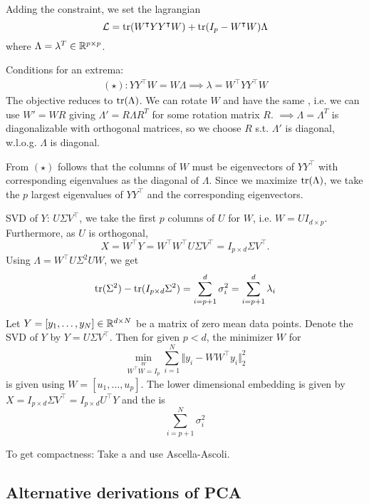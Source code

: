 Adding the constraint, we set the lagrangian 
\[\mathcal{L}=\text{tr}(W^\intercal YY^\intercal W)+\text{tr}(I_p-W^\intercal W)\Lambda\]
where $\Lambda=\lambda^T\in\mathbb{R}^{p\times p}$.

Conditions for an extrema:
\begin{align*}
    (\star):YY^\intercal W = W\Lambda\implies \lambda=W^\intercal YY^\intercal W
\end{align*}
The objective reduces to $\text{tr}(\Lambda)$. We can rotate $W$ and have the same ,
i.e. we can use $W'=WR$ giving $\Lambda'=R\Lambda R^T$ for some rotation matrix $R$.
$\implies \Lambda=\Lambda^T$ is diagonalizable with orthogonal matrices, so we choose $R$ s.t. 
$\Lambda'$ is diagonal, w.l.o.g. $\Lambda$ is diagonal.

From $(\star)$ follows that the columns of $W$ must be eigenvectors of $YY^\intercal$ with 
corresponding eigenvalues as the diagonal of $\Lambda$. Since we maximize $\text{tr}(\Lambda)$, we 
take the $p$ largest eigenvalues of $YY^\intercal$ and the corresponding eigenvectors.

SVD of $Y$: $U\Sigma V^\intercal$, we take the first $p$ columns of $U$ for $W$, i.e. $W=UI_{d\times p}$.
Furthermore, as $U$ is orthogonal,
\[X=W^\intercal Y=W^\intercal W^\intercal U \Sigma V^\intercal=I_{p\times d}\Sigma V^\intercal.\]
Using $\Lambda=W^\intercal U\Sigma^2 U W$, we get 
\[\text{tr}(\Sigma^2)-\text{tr}(I_{p\times d}\Sigma^2)=\sum_{i=p+1}^d \sigma_i^2=\sum_{i=p+1}^d \lambda_i\]

\begin{theorem}\label{thm:2.1}
    Let $Y=[y_1,\dots,y_N]\in\mathbb{R}^{d\times N}$ be a matrix of zero mean data points. Denote the SVD of 
    $Y$ by $Y=U\Sigma V^\intercal$. Then for given $p<d$, the minimizer $W$ for 
    \[\min_{\stackrel{W}{W^\intercal W=I_p}}\sum_{i=1}^N\Vert y_i-WW^\intercal y_i\Vert_2^2\]
    is given using $W=[u_1,\dots,u_p]$. The lower dimensional embedding is given by 
    $X=I_{p\times d}\Sigma V^\intercal=I_{p\times d}U^\intercal Y$ and the  
    is \[\sum_{i=p+1}^N\sigma_i^2\]
\end{theorem}


To get compactness: Take a and use Ascella-Ascoli. %


\subsection{Alternative derivations of PCA}

